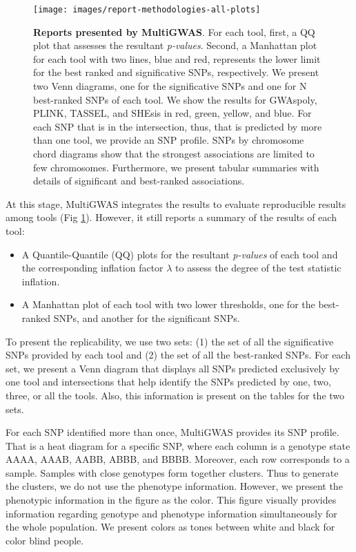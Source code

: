 \documentclass{article}
\begin{document}
\begin{figure}
\texttt{[image: images/report-methodologies-all-plots]} \caption{\textbf{Reports presented by MultiGWAS}. For each tool, first, a QQ plot that assesses the resultant \emph{p-values}. Second, a Manhattan plot for each tool with two lines, blue and red, represents the lower limit for the best ranked and significative SNPs, respectively. We present two Venn diagrams, one for the significative SNPs and one for N best-ranked SNPs of each tool. We show the results for GWAspoly, PLINK, TASSEL, and SHEsis in red, green, yellow, and blue. For each SNP that is in the intersection, thus, that is predicted by more than one tool, we provide an SNP profile. SNPs by chromosome chord diagrams show that the strongest associations are limited to few chromosomes. Furthermore, we present tabular summaries with details of significant and best-ranked associations.\label{fig: Reports} }
\end{figure}
At this stage, MultiGWAS integrates the results to evaluate reproducible results among tools (Fig \ref{fig: Reports}). However, it still reports a summary of the results of each tool: 
\begin{itemize}
\item A Quantile-Quantile (QQ) plots for the resultant \emph{p-values} of each tool and the corresponding inflation factor $\lambda$ to assess the degree of the test statistic inflation. 
\item A Manhattan plot of each tool with two lower thresholds, one for the best-ranked SNPs, and another for the significant SNPs. 
\end{itemize}
To present the replicability, we use two sets: (1) the set of all the significative SNPs provided by each tool and (2) the set of all the best-ranked SNPs. For each set, we present a Venn diagram that displays all SNPs predicted exclusively by one tool and intersections that help identify the SNPs predicted by one, two, three, or all the tools. Also, this information is present on the tables for the two sets.


For each SNP identified more than once, MultiGWAS provides its SNP profile. That is a heat diagram for a specific SNP, where each column is a genotype state AAAA, AAAB, AABB, ABBB, and BBBB. Moreover, each row corresponds to a sample. Samples with close genotypes form together clusters. Thus to generate the clusters, we do not use the phenotype information. However, we present the phenotypic information in the figure as the color. This figure visually provides information regarding genotype and phenotype information simultaneously for the whole population. We present colors as tones between white and black for color blind people.
\end{document}
